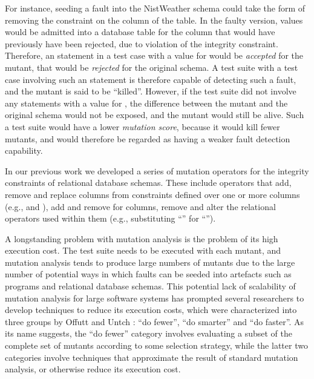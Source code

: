 For instance, seeding a fault into the NistWeather schema could take the form of removing the \NOTNULL constraint on the  column of the  table. In the faulty version, \NULL values would be admitted into a database table for the  column that would have previously have been rejected, due to violation of the integrity constraint. Therefore, an \INSERT statement in a test case with a \NULL value for  would be {\it accepted} for the mutant, that would be {\it rejected} for the original schema. A test suite with a test case involving such an \INSERT statement is therefore capable of detecting such a fault, and the mutant is said to be ``killed''. However, if the test suite did not involve any \INSERT statements with a \NULL value for , the difference between the mutant and the original schema would not be exposed, and the mutant would still be alive. Such a test suite would have a lower {\it mutation score}, because it would kill fewer mutants, and would therefore be regarded as having a weaker fault detection capability. 

In our previous work \cite{Kapfhammer2013,Wright2013,Wright2014} we developed a series of mutation operators for the integrity constraints of relational database schemas. These include operators that add, remove and replace columns from constraints defined over one or more columns (e.g., \PK and \FKCs), add and remove \NNCs for columns, remove \CCs and alter the relational operators used within them (e.g., substituting ``\sql{>}'' for ``\sql{>=}''). 

A longstanding problem with mutation analysis is the problem of its high execution cost. The test suite needs to be executed with each mutant, and mutation analysis tends to produce large numbers of mutants due to the large number of potential ways in which faults can be seeded into artefacts such as programs and relational database schemas. This potential lack of scalability of mutation analysis for large software systems has prompted several researchers to develop techniques to reduce its execution costs, which were characterized into three groups by Offutt and Untch \cite{Offutt2001}: ``do fewer'', ``do smarter'' and ``do faster''. As its name suggests, the ``do fewer'' category involves evaluating a subset of the complete set of mutants according to some selection strategy, while the latter two categories involve techniques that approximate the result of standard mutation analysis, or otherwise reduce its execution cost.  

